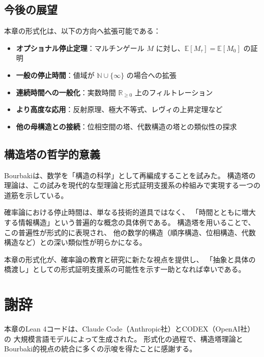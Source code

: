 \documentclass[11pt,a4paper,ja=standard]{ltjsarticle}
\theoremstyle{definition}
\newcommand{\N}{\mathbb{N}}
\newcommand{\R}{\mathbb{R}}
\begin{document}
\subsection{今後の展望}

本章の形式化は、以下の方向へ拡張可能である：

\begin{itemize}
\item \textbf{オプショナル停止定理}：マルチンゲール $M$ に対し、$\mathbb{E}[M_\tau] = \mathbb{E}[M_0]$ の証明

\item \textbf{一般の停止時間}：値域が $\N \cup \{\infty\}$ の場合への拡張

\item \textbf{連続時間への一般化}：実数時間 $\R_{\ge 0}$ 上のフィルトレーション

\item \textbf{より高度な応用}：反射原理、極大不等式、レヴィの上昇定理など

\item \textbf{他の母構造との接続}：位相空間の塔、代数構造の塔との類似性の探求
\end{itemize}

\subsection{構造塔の哲学的意義}

Bourbakiは、数学を「構造の科学」として再編成することを試みた。
構造塔の理論は、この試みを現代的な型理論と形式証明支援系の枠組みで実現する一つの道筋を示している。

確率論における停止時間は、単なる技術的道具ではなく、
「時間とともに増大する情報構造」という普遍的な概念の具体例である。
構造塔を用いることで、この普遍性が形式的に表現され、
他の数学的構造（順序構造、位相構造、代数構造など）との深い類似性が明らかになる。

本章の形式化が、確率論の教育と研究に新たな視点を提供し、
「抽象と具体の橋渡し」としての形式証明支援系の可能性を示す一助となれば幸いである。

\section*{謝辞}

本章のLean 4コードは、Claude Code（Anthropic社）とCODEX（OpenAI社）の
大規模言語モデルによって生成された。
形式化の過程で、構造塔理論とBourbaki的視点の統合に多くの示唆を得たことに感謝する。
\end{document}
